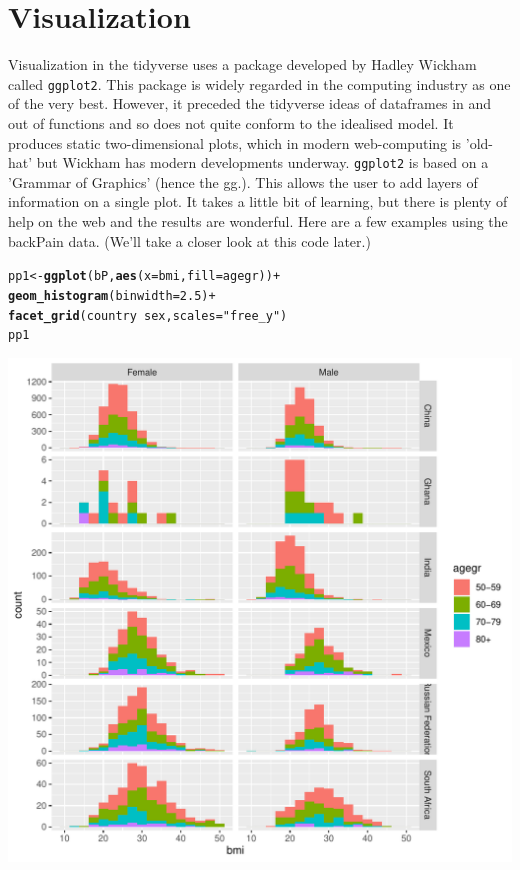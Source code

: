 \documentclass[titlepage]{book}
\makeatletter
\def\maxwidth{ %
  \ifdim\Gin@nat@width>\linewidth
    \linewidth
  \else
    \Gin@nat@width
  \fi
}
\newcommand{\hlnum}[1]{\textcolor[rgb]{0.686,0.059,0.569}{#1}}%
\newcommand{\hlstr}[1]{\textcolor[rgb]{0.192,0.494,0.8}{#1}}%
\newcommand{\hlopt}[1]{\textcolor[rgb]{0,0,0}{#1}}%
\newcommand{\hlstd}[1]{\textcolor[rgb]{0.345,0.345,0.345}{#1}}%
\newcommand{\hlkwb}[1]{\textcolor[rgb]{0.69,0.353,0.396}{#1}}%
\newcommand{\hlkwc}[1]{\textcolor[rgb]{0.333,0.667,0.333}{#1}}%
\newcommand{\hlkwd}[1]{\textcolor[rgb]{0.737,0.353,0.396}{\textbf{#1}}}%
\newenvironment{kframe}{%
 \def\at@end@of@kframe{}%
 \ifinner\ifhmode%
  \def\at@end@of@kframe{\end{minipage}}%
  \begin{minipage}{\columnwidth}%
 \fi\fi%
 \def\FrameCommand##1{\hskip\@totalleftmargin \hskip-\fboxsep
 \colorbox{shadecolor}{##1}\hskip-\fboxsep
     \hskip-\linewidth \hskip-\@totalleftmargin \hskip\columnwidth}%
 \MakeFramed {\advance\hsize-\width
   \@totalleftmargin\z@ \linewidth\hsize
   \@setminipage}}%
 {\par\unskip\endMakeFramed%
 \at@end@of@kframe}
\newenvironment{knitrout}{}{} %
\makeatother
\begin{document}
\section{Visualization}

Visualization in the tidyverse uses a package developed by Hadley Wickham called \texttt{ggplot2}. This package is widely regarded in the computing industry as one of the very best.  However, it preceded the tidyverse ideas of dataframes in and out of functions and so does not quite conform to the idealised model. It produces static two-dimensional plots, which in modern web-computing is 'old-hat' but Wickham has modern developments underway. 
\texttt{ggplot2} is based on a 'Grammar of Graphics' (hence the gg.). This allows the user to add layers of information on a single plot.  It takes a little bit of learning, but there is plenty of help on the web and the results are wonderful.
Here are a few examples using the backPain data. (We'll take a closer look at this code later.)


\begin{knitrout}
\color{fgcolor}\begin{kframe}
\begin{alltt}
\hlstd{pp1} \hlkwb{<-} \hlkwd{ggplot}\hlstd{(bP,} \hlkwd{aes}\hlstd{(}\hlkwc{x}\hlstd{=bmi,} \hlkwc{fill}\hlstd{=agegr))} \hlopt{+}
  \hlkwd{geom_histogram}\hlstd{(}\hlkwc{binwidth} \hlstd{=} \hlnum{2.5}\hlstd{)} \hlopt{+}
  \hlkwd{facet_grid}\hlstd{(country} \hlopt{~} \hlstd{sex,}\hlkwc{scales}\hlstd{=}\hlstr{"free_y"}\hlstd{)}
\hlstd{pp1}
\end{alltt}
\end{kframe}
\includegraphics[width=\maxwidth]{figure/L1_FacetedHistograms-1} 

\end{knitrout}
\end{document}
